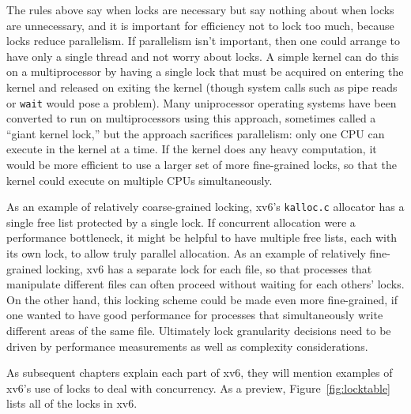 The rules above say when locks are necessary but say nothing about when locks
are unnecessary, and it is important for efficiency not to lock too much,
because locks reduce parallelism.  If parallelism isn't important, then one
could arrange to have only a single thread and not worry about locks.  A simple
kernel can do this on a multiprocessor by having a single lock that must be
acquired on entering the kernel and released on exiting the kernel (though
system calls such as pipe reads or
\lstinline{wait}
would pose a problem).  Many uniprocessor operating systems have been converted to
run on multiprocessors using this approach, sometimes called a ``giant
kernel lock,'' but the approach sacrifices parallelism: only one
CPU can execute in the kernel at a time.  If the kernel does any heavy
computation, it would be more efficient to use a larger set of more
fine-grained locks, so that the kernel could execute on multiple CPUs
simultaneously.

As an example of relatively coarse-grained locking, xv6's
\lstinline{kalloc.c}
allocator has a single free list protected by a single
lock. If concurrent allocation were a performance bottleneck,
it might be helpful to have multiple free lists, each with
its own lock, to allow truly parallel allocation.
As an example of relatively fine-grained locking, xv6
has a separate lock for each file, so that processes that
manipulate different files can often proceed without waiting
for each others' locks. On the other hand, this locking
scheme could be made even more fine-grained, if one wanted
to have good performance for processes that simultaneously
write different areas of the same file.
Ultimately lock granularity decisions need to be driven
by performance measurements as well as complexity considerations.

As subsequent chapters explain each part of xv6, they
will mention examples of xv6's use of locks
to deal with concurrency.
As a preview,
Figure~\ref{fig:locktable}
lists all of the locks in xv6.

